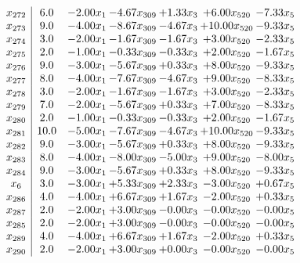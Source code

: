 \documentclass[8pt]{article}
\begin{document}
\[\begin{array}{c| c c@{\hskip 2pt} c@{\hskip 2pt} c@{\hskip 2pt} c@{\hskip 2pt} c@{\hskip 2pt} }
 x_{272}   &  6.0 & -2.00 x_{1} & -4.67 x_{309} & +  1.33 x_{3} & +  6.00 x_{520} & -7.33 x_{5}\\
 x_{273}   &  9.0 & -4.00 x_{1} & -8.67 x_{309} & -4.67 x_{3} & + 10.00 x_{520} & -9.33 x_{5}\\
 x_{274}   &  3.0 & -2.00 x_{1} & -1.67 x_{309} & -1.67 x_{3} & +  3.00 x_{520} & -2.33 x_{5}\\
 x_{275}   &  2.0 & -1.00 x_{1} & -0.33 x_{309} & -0.33 x_{3} & +  2.00 x_{520} & -1.67 x_{5}\\
 x_{276}   &  9.0 & -3.00 x_{1} & -5.67 x_{309} & +  0.33 x_{3} & +  8.00 x_{520} & -9.33 x_{5}\\
 x_{277}   &  8.0 & -4.00 x_{1} & -7.67 x_{309} & -4.67 x_{3} & +  9.00 x_{520} & -8.33 x_{5}\\
 x_{278}   &  3.0 & -2.00 x_{1} & -1.67 x_{309} & -1.67 x_{3} & +  3.00 x_{520} & -2.33 x_{5}\\
 x_{279}   &  7.0 & -2.00 x_{1} & -5.67 x_{309} & +  0.33 x_{3} & +  7.00 x_{520} & -8.33 x_{5}\\
 x_{280}   &  2.0 & -1.00 x_{1} & -0.33 x_{309} & -0.33 x_{3} & +  2.00 x_{520} & -1.67 x_{5}\\
 x_{281}   &  10.0 & -5.00 x_{1} & -7.67 x_{309} & -4.67 x_{3} & + 10.00 x_{520} & -9.33 x_{5}\\
 x_{282}   &  9.0 & -3.00 x_{1} & -5.67 x_{309} & +  0.33 x_{3} & +  8.00 x_{520} & -9.33 x_{5}\\
 x_{283}   &  8.0 & -4.00 x_{1} & -8.00 x_{309} & -5.00 x_{3} & +  9.00 x_{520} & -8.00 x_{5}\\
 x_{284}   &  9.0 & -3.00 x_{1} & -5.67 x_{309} & +  0.33 x_{3} & +  8.00 x_{520} & -9.33 x_{5}\\
 x_{6}   &  3.0 & -3.00 x_{1} & +  5.33 x_{309} & +  2.33 x_{3} & -3.00 x_{520} & +  0.67 x_{5}\\
 x_{286}   &  4.0 & -4.00 x_{1} & +  6.67 x_{309} & +  1.67 x_{3} & -2.00 x_{520} & +  0.33 x_{5}\\
 x_{287}   &  2.0 & -2.00 x_{1} & +  3.00 x_{309} & -0.00 x_{3} & -0.00 x_{520} & -0.00 x_{5}\\
 x_{285}   &  2.0 & -2.00 x_{1} & +  3.00 x_{309} & -0.00 x_{3} & -0.00 x_{520} & -0.00 x_{5}\\
 x_{289}   &  4.0 & -4.00 x_{1} & +  6.67 x_{309} & +  1.67 x_{3} & -2.00 x_{520} & +  0.33 x_{5}\\
 x_{290}   &  2.0 & -2.00 x_{1} & +  3.00 x_{309} & +  0.00 x_{3} & -0.00 x_{520} & -0.00 x_{5}\\

\end{array}\]
\end{document}

